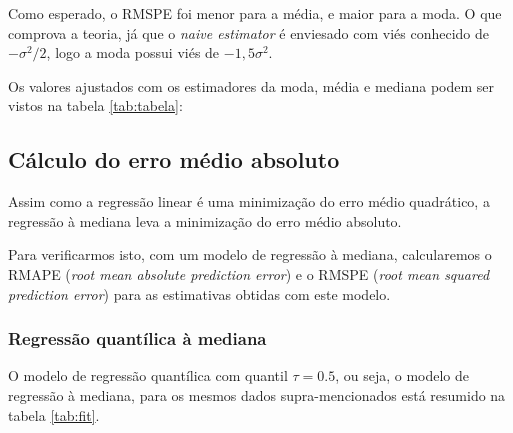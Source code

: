 \documentclass[a4paper]{article}
\begin{document}
Como esperado, o RMSPE foi menor para a média, e maior para a moda. O
que comprova a teoria, já que o \emph{naive estimator} é enviesado com
viés conhecido de \(-\sigma^2/2\), logo a moda possui viés de
\(-1,5\sigma^2\).

Os valores ajustados com os estimadores da moda, média e mediana podem
ser vistos na tabela \ref{tab:tabela}:

\subsection{Cálculo do erro médio
absoluto}\label{calculo-do-erro-medio-absoluto}

Assim como a regressão linear é uma minimização do erro médio
quadrático, a regressão à mediana leva a minimização do erro médio
absoluto.

Para verificarmos isto, com um modelo de regressão à mediana,
calcularemos o RMAPE (\emph{root mean absolute prediction error}) e o
RMSPE (\emph{root mean squared prediction error}) para as estimativas
obtidas com este modelo.

\subsubsection{Regressão quantílica à
mediana}\label{regressao-quantilica-a-mediana}

O modelo de regressão quantílica com quantil \(\tau = 0.5\), ou seja, o
modelo de regressão à mediana, para os mesmos dados supra-mencionados
está resumido na tabela \ref{tab:fit}.
\end{document}
